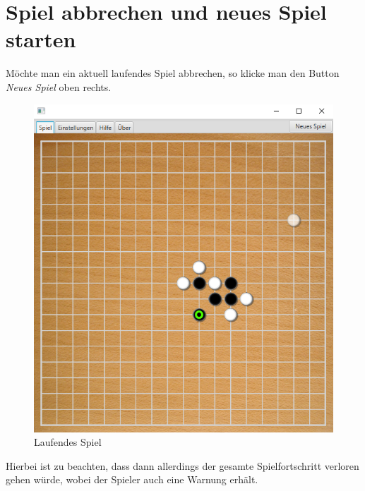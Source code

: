 \documentclass[11pt]{article}
\newcommand{\1}{{\mathds{1}}}
\newcommand{\imagewidth}{.8\linewidth}
\begin{document}
	\section{Spiel abbrechen und neues Spiel starten}
	
	Möchte man ein aktuell laufendes Spiel abbrechen, so klicke man den Button \textit{Neues Spiel} oben rechts.
	
	\begin{figure}[H]
		\centering
		\includegraphics[width=\imagewidth]{spiel.png}
		\caption{Laufendes Spiel}
		\label{spiel}
	\end{figure}
	
	Hierbei ist zu beachten, dass dann allerdings der gesamte Spielfortschritt verloren gehen würde, wobei der Spieler auch eine Warnung erhält. 
	
\end{document}
